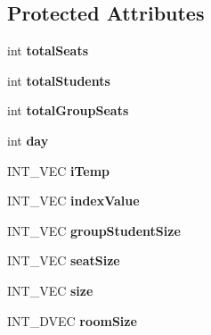 \subsection*{Protected Attributes}
\begin{DoxyCompactItemize}
\item 
\hypertarget{classSeatPlan_a6915f74be45af73cda8c9a51b6cb99c9}{int {\bfseries total\-Seats}}\label{classSeatPlan_a6915f74be45af73cda8c9a51b6cb99c9}

\item 
\hypertarget{classSeatPlan_a3568dfc375740fd6b4075d7dc419a2e5}{int {\bfseries total\-Students}}\label{classSeatPlan_a3568dfc375740fd6b4075d7dc419a2e5}

\item 
\hypertarget{classSeatPlan_a18b1d6497343d6a9e751159dcdd8a179}{int {\bfseries total\-Group\-Seats}}\label{classSeatPlan_a18b1d6497343d6a9e751159dcdd8a179}

\item 
\hypertarget{classSeatPlan_acf6fa47342ec7f5675064c5601800f5c}{int {\bfseries day}}\label{classSeatPlan_acf6fa47342ec7f5675064c5601800f5c}

\item 
\hypertarget{classSeatPlan_a19a423aff33092a242f5dff5694efa37}{I\-N\-T\-\_\-\-V\-E\-C {\bfseries i\-Temp}}\label{classSeatPlan_a19a423aff33092a242f5dff5694efa37}

\item 
\hypertarget{classSeatPlan_af3fbce455c6744dee3fedb97442cd2c3}{I\-N\-T\-\_\-\-V\-E\-C {\bfseries index\-Value}}\label{classSeatPlan_af3fbce455c6744dee3fedb97442cd2c3}

\item 
\hypertarget{classSeatPlan_a6cb00329d2f0760f679d7e00958da879}{I\-N\-T\-\_\-\-V\-E\-C {\bfseries group\-Student\-Size}}\label{classSeatPlan_a6cb00329d2f0760f679d7e00958da879}

\item 
\hypertarget{classSeatPlan_a73de1d93e86c3a23406e0903c546ea2c}{I\-N\-T\-\_\-\-V\-E\-C {\bfseries seat\-Size}}\label{classSeatPlan_a73de1d93e86c3a23406e0903c546ea2c}

\item 
\hypertarget{classSeatPlan_a45d2c9c1d580d442bc15dcb50265d627}{I\-N\-T\-\_\-\-V\-E\-C {\bfseries size}}\label{classSeatPlan_a45d2c9c1d580d442bc15dcb50265d627}

\item 
\hypertarget{classSeatPlan_a52bafc6123bd54a8f95253c4693b2975}{I\-N\-T\-\_\-D\-V\-E\-C {\bfseries room\-Size}}\label{classSeatPlan_a52bafc6123bd54a8f95253c4693b2975}


\end{DoxyCompactItemize}
